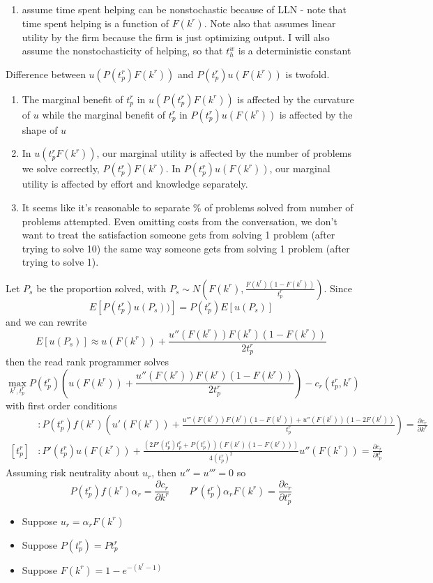 \documentclass[source/paper/main.tex]{subfiles}
\begin{document}
\begin{enumerate}
    \item \cite{garicano_hierarchies_2000} assume time spent helping can be nonstochastic because of LLN - note that time spent helping is a function of $F(k^r)$. Note also that \cite{garicano_hierarchies_2000} assumes linear utility by the firm because the firm is just optimizing output. I will also assume the nonstochasticity of helping, so that $t_h^w$ is a deterministic constant
\end{enumerate}
Difference between $u(P(t_p^r) F(k^r))$ and $P(t_p^r) u(F(k^r))$ is twofold.
\begin{enumerate}
    \item The marginal benefit of $t_p^r$ in $u(P(t_p^r) F(k^r))$ is affected by the curvature of $u$ while the marginal benefit of $t_p^r$ in $P(t_p^r) u(F(k^r))$ is affected by the shape of $u$ 
    \item In $u(t_p^rF(k^r))$, our marginal utility is affected by the number of problems we solve correctly, $P(t_p^r)F(k^r)$. In $P(t_p^r) u(F(k^r))$, our marginal utility is affected by effort and knowledge separately. 
    \item It seems like it's reasonable to separate \% of problems solved from number of problems attempted. Even omitting costs from the conversation, we don't want to treat the satisfaction someone gets from solving 1 problem (after trying to solve 10) the same way someone gets from solving 1 problem (after trying to solve 1). 
\end{enumerate}
Let $P_s$ be the proportion solved, with $P_s \sim N(F(k^r), \frac{F(k^r)(1-F(k^r))}{t_p^r})$. Since $$E[P(t_p^r)u(P_s))] = P(t_p^r)E[u(P_s)]$$ and we can rewrite $$E[u(P_s)] \approx u(F(k^r)) + \frac{u''(F(k^r))F(k^r)(1-F(k^r))}{2t_p^r}$$
then the read rank programmer solves 
$$\max_{k^r, t_p^r} P(t_p^r)\left(u(F(k^r)) + \frac{u''(F(k^r))F(k^r)(1-F(k^r))}{2t_p^r}\right) - c_r(t_p^r, k^r)$$
with first order conditions
\begin{align*}
    [k^r] &: P(t_p^r)f(k^r)\left(u'(F(k^r)) + \frac{u'''(F(k^r))F(k^r)(1-F(k^r)) + u''(F(k^r))  (1-2F(k^r))}{t_p^r}\right)= \frac{\partial c_r}{\partial k^r}\\
    [t_p^r] &: P'(t_p^r) u(F(k^r)) + \frac{(2P'(t_p^r)t_p^r + P(t_p^r))(F(k^r)(1-F(k^r)))}{4(t_p^r)^2}u''(F(k^r)) = \frac{\partial c_r}{\partial t_p^r}
\end{align*}
Assuming risk neutrality about $u_r$, then $u'' = u''' = 0$ so 
$$P(t_p^r)f(k^r)\alpha_r = \frac{\partial c_r}{\partial k^r} \qquad P'(t_p^r)\alpha_r F(k^r) = \frac{\partial c_r}{\partial t_p^r}$$
\begin{itemize}
    \item Suppose $u_r = \alpha_r F(k^r)$
    \item Suppose $P(t_p^r) = P t_p^r$
    \item Suppose $F(k^r) = 1-e^{-(k^r - 1)}$
\end{itemize}
\end{document}
